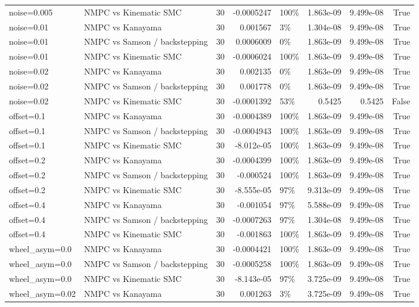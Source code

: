 \begin{table}
\begin{tabular}{llrrlrrr}
noise=0.005 & NMPC vs Kinematic SMC & 30 & -0.0005247 & 100\% & 1.863e-09 & 9.499e-08 & True \\
noise=0.01 & NMPC vs Kanayama & 30 & 0.001567 & 3\% & 1.304e-08 & 9.499e-08 & True \\
noise=0.01 & NMPC vs Samson / backstepping & 30 & 0.0006009 & 0\% & 1.863e-09 & 9.499e-08 & True \\
noise=0.01 & NMPC vs Kinematic SMC & 30 & -0.0006024 & 100\% & 1.863e-09 & 9.499e-08 & True \\
noise=0.02 & NMPC vs Kanayama & 30 & 0.002135 & 0\% & 1.863e-09 & 9.499e-08 & True \\
noise=0.02 & NMPC vs Samson / backstepping & 30 & 0.001778 & 0\% & 1.863e-09 & 9.499e-08 & True \\
noise=0.02 & NMPC vs Kinematic SMC & 30 & -0.0001392 & 53\% & 0.5425 & 0.5425 & False \\
offset=0.1 & NMPC vs Kanayama & 30 & -0.0004389 & 100\% & 1.863e-09 & 9.499e-08 & True \\
offset=0.1 & NMPC vs Samson / backstepping & 30 & -0.0004943 & 100\% & 1.863e-09 & 9.499e-08 & True \\
offset=0.1 & NMPC vs Kinematic SMC & 30 & -8.012e-05 & 100\% & 1.863e-09 & 9.499e-08 & True \\
offset=0.2 & NMPC vs Kanayama & 30 & -0.0004399 & 100\% & 1.863e-09 & 9.499e-08 & True \\
offset=0.2 & NMPC vs Samson / backstepping & 30 & -0.000524 & 100\% & 1.863e-09 & 9.499e-08 & True \\
offset=0.2 & NMPC vs Kinematic SMC & 30 & -8.555e-05 & 97\% & 9.313e-09 & 9.499e-08 & True \\
offset=0.4 & NMPC vs Kanayama & 30 & -0.001054 & 97\% & 5.588e-09 & 9.499e-08 & True \\
offset=0.4 & NMPC vs Samson / backstepping & 30 & -0.0007263 & 97\% & 1.304e-08 & 9.499e-08 & True \\
offset=0.4 & NMPC vs Kinematic SMC & 30 & -0.001863 & 100\% & 1.863e-09 & 9.499e-08 & True \\
wheel\_asym=0.0 & NMPC vs Kanayama & 30 & -0.0004421 & 100\% & 1.863e-09 & 9.499e-08 & True \\
wheel\_asym=0.0 & NMPC vs Samson / backstepping & 30 & -0.0005258 & 100\% & 1.863e-09 & 9.499e-08 & True \\
wheel\_asym=0.0 & NMPC vs Kinematic SMC & 30 & -8.143e-05 & 97\% & 3.725e-09 & 9.499e-08 & True \\
wheel\_asym=0.02 & NMPC vs Kanayama & 30 & 0.001263 & 3\% & 3.725e-09 & 9.499e-08 & True \\

\end{tabular}
\end{table}
